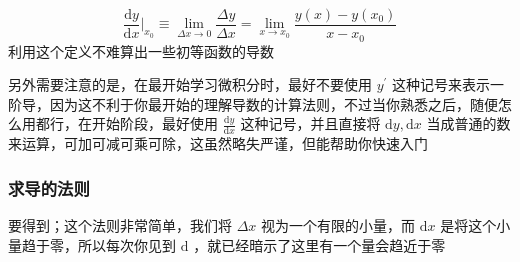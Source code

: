 \documentclass[lang=cn,newtx,10pt,scheme=chinese]{elegantbook}
\begin{document}
\begin{equation}
  \frac{\mathrm{d}y}{\mathrm{d}x} \big|_{x_0}\equiv \lim_{\Delta x \to 0} \frac{\Delta y}{\Delta x}=\lim_{x \to x_0} \frac{y(x)-y(x_0)}{x-x_0}
\end{equation}
利用这个定义不难算出一些初等函数的导数

另外需要注意的是，在最开始学习微积分时，最好不要使用 $y^{\prime }$ 这种记号来表示一阶导，因为这不利于你最开始的理解导数的计算法则，不过当你熟悉之后，随便怎么用都行，在开始阶段，最好使用 $\frac{\mathrm{d}y}{\mathrm{d}x}$ 这种记号，并且直接将 $\mathrm{d}y,\mathrm{d}x$ 当成普通的数来运算，可加可减可乘可除，这虽然略失严谨，但能帮助你快速入门
\subsubsection{求导的法则}


要得到；这个法则非常简单，我们将 $\Delta x$ 视为一个有限的小量，而 $\mathrm{d}x$ 是将这个小量趋于零，所以每次你见到 $\mathrm{d}$ ，就已经暗示了这里有一个量会趋近于零 
\end{document}
